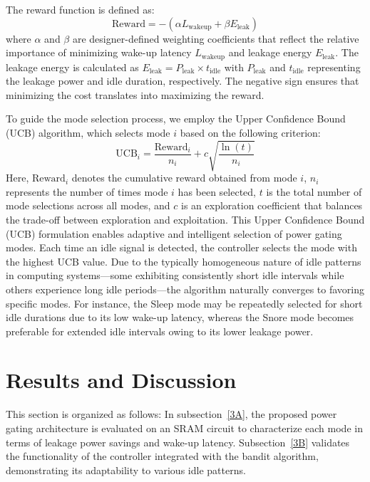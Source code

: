 \documentclass[conference]{IEEEtran}
\begin{document}
The reward function is defined as:
\begin{equation}
    \text{Reward} = -(\alpha L_{\text{wakeup}} + \beta E_{\text{leak}})
\end{equation}
where $\alpha$ and $\beta$ are designer-defined weighting coefficients that reflect the relative importance of minimizing wake-up latency $L_{\text{wakeup}}$ and leakage energy $E_{\text{leak}}$. The leakage energy is calculated as $E_{\text{leak}} = P_{\text{leak}} \times t_{\text{idle}}$
with $P_{\text{leak}}$ and $t_{\text{idle}}$ representing the leakage power and idle duration, respectively. The negative sign ensures that minimizing the cost translates into maximizing the reward.

To guide the mode selection process, we employ the Upper Confidence Bound (UCB) algorithm, which selects mode $i$ based on the following criterion:
\begin{equation}
    \text{UCB}_i = \frac{\text{Reward}_i}{n_i} + c \sqrt{\frac{\ln(t)}{n_i}}
\end{equation}
Here, $\text{Reward}_i$ denotes the cumulative reward obtained from mode $i$, $n_i$ represents the number of times mode $i$ has been selected, $t$ is the total number of mode selections across all modes, and $c$ is an exploration coefficient that balances the trade-off between exploration and exploitation. This Upper Confidence Bound (UCB) formulation enables adaptive and intelligent selection of power gating modes. Each time an idle signal is detected, the controller selects the mode with the highest UCB value. Due to the typically homogeneous nature of idle patterns in computing systems—some exhibiting consistently short idle intervals while others experience long idle periods—the algorithm naturally converges to favoring specific modes. For instance, the Sleep mode may be repeatedly selected for short idle durations due to its low wake-up latency, whereas the Snore mode becomes preferable for extended idle intervals owing to its lower leakage power.



\section{Results and Discussion}
This section is organized as follows: In subsection~\ref{3A}, the proposed power gating architecture is evaluated on an SRAM circuit to characterize each mode in terms of leakage power savings and wake-up latency. Subsection~\ref{3B} validates the functionality of the controller integrated with the bandit algorithm, demonstrating its adaptability to various idle patterns. %
\end{document}
